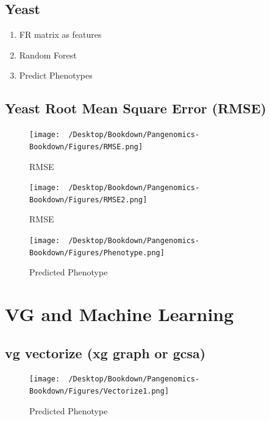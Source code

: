 \documentclass[
]{book}
\providecommand{\tightlist}{%
  \setlength{\itemsep}{0pt}\setlength{\parskip}{0pt}}
\begin{document}
\hypertarget{yeast}{%
\subsection{Yeast}\label{yeast}}

\begin{enumerate}
\def\labelenumi{\arabic{enumi}.}
\tightlist
\item
  FR matrix as features
\item
  Random Forest
\item
  Predict Phenotypes
\end{enumerate}

\hypertarget{yeast-root-mean-square-error-rmse}{%
\subsection{Yeast Root Mean Square Error (RMSE)}\label{yeast-root-mean-square-error-rmse}}

\begin{figure}
\centering
\texttt{[image: ~/Desktop/Bookdown/Pangenomics-Bookdown/Figures/RMSE.png]}
\caption{RMSE}
\end{figure}

\begin{figure}
\centering
\texttt{[image: ~/Desktop/Bookdown/Pangenomics-Bookdown/Figures/RMSE2.png]}
\caption{RMSE}
\end{figure}

\begin{figure}
\centering
\texttt{[image: ~/Desktop/Bookdown/Pangenomics-Bookdown/Figures/Phenotype.png]}
\caption{Predicted Phenotype}
\end{figure}

\hypertarget{vg-and-machine-learning}{%
\section{VG and Machine Learning}\label{vg-and-machine-learning}}

\hypertarget{vg-vectorize-xg-graph-or-gcsa}{%
\subsection{vg vectorize (xg graph or gcsa)}\label{vg-vectorize-xg-graph-or-gcsa}}

\begin{figure}
\centering
\texttt{[image: ~/Desktop/Bookdown/Pangenomics-Bookdown/Figures/Vectorize1.png]}
\caption{Predicted Phenotype}
\end{figure}
\end{document}
